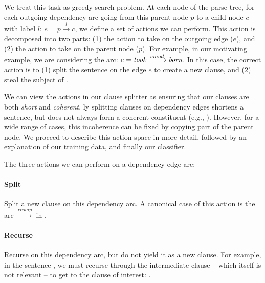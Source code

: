 We treat this task as greedy search problem.
At each node of the parse tree, for each outgoing dependency arc going
  from this parent node $p$ to a child node $c$ with label $l$:
  $e = p \xrightarrow{l} c$, we define a set of actions we can perform.
This action is decomposed into two parts: (1) the action to take on the outgoing
  edge ($e$), and (2) the action to take on the
  parent node ($p$).
For example, in our motivating example, we are considering the arc:
  $e = \textit{took} \xrightarrow{vmod} \textit{born}$.
In this case, the correct action is to
  (1) split the sentence on the edge $e$ to create a new clause,
  and (2) steal the subject of . 

We can view the actions in our clause splitter as ensuring that our
  clauses are both \textit{short} and \textit{coherent}.
\Naive ly splitting clauses on dependency edges shortens a sentence, 
   but does not
  always form a coherent constituent (e.g., ).
However, for a wide range of cases, this incoherence can be fixed by copying
  part of the parent node. 
We proceed to describe this action space in more detail, followed by an
  explanation of our training data, and finally our classifier.

%
%
The three actions we can perform on a dependency edge are:

\paragraph{Split}
  Split a new clause on this dependency arc.
  A canonical case of this action is the arc 
     $\xrightarrow{ccomp}$  in
    .

\paragraph{Recurse}
  Recurse on this dependency arc, but do not yield it as a new clause.
  For example, in the sentence , we must recurse through the intermediate clause
   -- which itself is not relevant
  -- to get to the clause of interest: .

